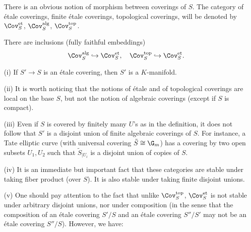 \noindent There is an obvious notion of morphism
 between coverings of $S$.  The category of \'etale coverings, \resp
 finite \'etale coverings, \resp topological coverings, will be denoted
 by $\Cov^{\mathrm{et}}_S$, \resp $\Cov^{\mathrm{alg}}_S$, \resp
 $\Cov^{\mathrm{top}}_S$.
 
 \medskip There are inclusions (fully faithful embeddings) 
 \begin{equation*}
  \Cov^{\mathrm{alg}}_S \hookrightarrow  \Cov^{\mathrm{et}}_S,
   \quad \Cov^{\mathrm{top}}_S \hookrightarrow  \Cov^{\mathrm{et}}_S.
 \end{equation*}

\begin{rems}
 (i) If $S'\to S$ is an \'etale covering, then $S'$ is a $K$-manifold.

 (ii) It is worth noticing that the notions of \'etale and of 
 topological coverings are local on the base $S$, but not the
 notion of algebraic coverings (except if $S$ is compact).

 (iii) Even if $S$ is covered by finitely many $U$'s as in the
 definition, it does not follow that $S'$ is a disjoint union of
 finite algebraic coverings of $S$. For instance, a Tate elliptic
 curve (with universal covering $\tilde S\cong \G_m$) has a
 covering by two open subsets $U_1,U_2$ such that $\tilde S_{|
 U_i}$ is a disjoint union of copies of $S$.

  (iv) It is an immediate but important fact that these
 categories are stable under taking fiber product (over $S$). 
 It is also stable under taking finite disjoint unions.

  (v) One should pay attention to the fact that unlike
 $\Cov^{\mathrm{top}}_S$, $\Cov^{\mathrm{et}}_S$ is not stable 
 under arbitrary disjoint unions, nor under composition (in the sense
 that the composition of an \'etale covering $S'/S$ and an \'etale
 covering $S''/S'$ may not be an \'etale covering
 $S''/S$). However, we have:
\end{rems}


